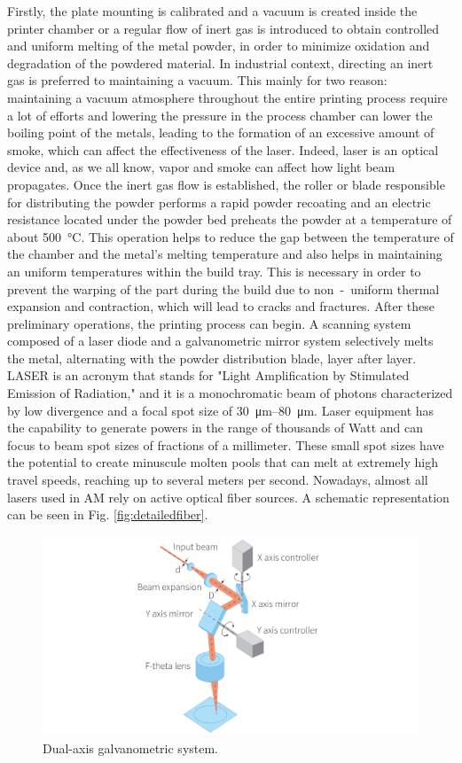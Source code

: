 Firstly, the plate mounting is calibrated and a vacuum is created inside the printer chamber or a regular flow of inert gas is introduced to obtain controlled and uniform melting of the metal powder, in order to minimize oxidation and degradation of the powdered material. In industrial context, directing an inert gas is preferred to maintaining a vacuum. This mainly for two reason: maintaining a vacuum atmosphere throughout the entire printing process require a lot of efforts and lowering the pressure in the process chamber can lower the boiling point of the metals, leading to the formation of an excessive amount of smoke, which can affect the effectiveness of the laser. Indeed, laser is an optical device and, as we all know, vapor and smoke can affect how light beam propagates. Once the inert gas flow is established, the roller or blade responsible for distributing the powder performs a rapid powder recoating and an electric resistance located under the powder bed preheats the powder at a temperature of about \SI{500}{\degreeCelsius}. This operation helps to reduce the gap between the temperature of the chamber and the metal's melting temperature and also helps in maintaining an uniform temperatures within the build tray. This is necessary in order to prevent the warping of the part during the build due to non~-~uniform thermal expansion and contraction, which will lead to cracks and fractures. After these preliminary operations, the printing process can begin. A scanning system composed of a laser diode and a galvanometric mirror system selectively melts the metal, alternating with the powder distribution blade, layer after layer. LASER is an acronym that stands for "Light Amplification by Stimulated Emission of Radiation," and it is a monochromatic beam of photons characterized by low divergence and a focal spot size of \SIrange[range-phrase = --]{30}{80}{\micro\metre}. Laser equipment has the capability to generate powers in the range of thousands of Watt and can focus to beam spot sizes of fractions of a millimeter. These small spot sizes have the potential to create minuscule molten pools that can melt at extremely high travel speeds, reaching up to several meters per second. Nowadays, almost all lasers used in AM rely on active optical fiber sources. A schematic representation can be seen in Fig. \ref{fig:detailedfiber}. 
\begin{figure}
    \centering
    \includegraphics[scale=0.5]{Images/galvanometro.png}
    \caption[Galvanometric system.]{Dual-axis galvanometric system.}
    \label{fig:galvano}
\end{figure}

